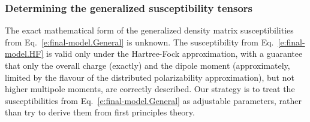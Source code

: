 \documentclass[aip,amsmath,amssymb,reprint]{revtex4-1}
\begin{document}
\subsubsection{Determining the generalized susceptibility tensors}

The exact mathematical form of the generalized density matrix susceptibilities 
from Eq.~\eqref{e:final-model.General} is unknown. 
The susceptibility from Eq.~\eqref{e:final-model.HF} is valid only under the Hartree\hyp{}Fock
approximation, with a guarantee that only the overall charge (exactly) and the dipole moment (approximately,
limited by the flavour of the distributed polarizability approximation), 
but not higher multipole moments, are correctly described.
Our strategy is to treat the susceptibilities from Eq.~\eqref{e:final-model.General}
as adjustable parameters, rather than try to derive them from first principles theory.
\end{document}
